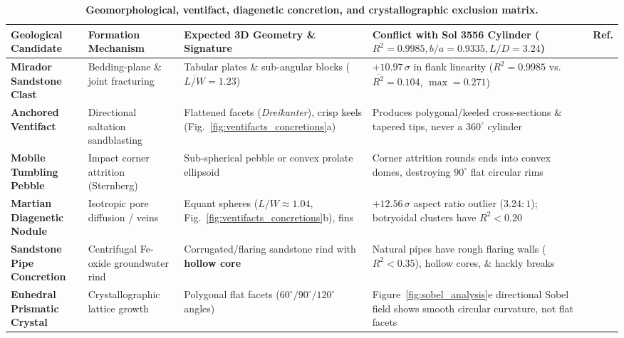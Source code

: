 \documentclass[11pt,a4paper]{article}
\begin{document}
\begin{table}[!ht]
\centering
\footnotesize
\setlength{\tabcolsep}{4pt}
\renewcommand{\arraystretch}{1.26}
\caption{\textbf{Geomorphological, ventifact, diagenetic concretion, and crystallographic exclusion matrix.}}
\label{tab:geology_exclusion}
\vspace{2pt}
\begin{tabular}{>{\raggedright\arraybackslash}p{2.75cm}>{\raggedright\arraybackslash}p{2.65cm}>{\raggedright\arraybackslash}p{3.15cm}>{\raggedright\arraybackslash}p{4.65cm}>{\centering\arraybackslash}p{1.2cm}}
\toprule
\textbf{Geological Candidate} & \textbf{Formation Mechanism} & \textbf{Expected 3D Geometry \& Signature} & \textbf{Conflict with Sol 3556 Cylinder ($R^2 = 0.9985, b/a = 0.9335, L/D = 3.24$)} & \textbf{Ref.} \\
\midrule
\textbf{Mirador Sandstone Clast} & Bedding-plane \& joint fracturing & Tabular plates \& sub-angular blocks ($\overline{L/W} = 1.23$) & $+10.97\,\sigma$ in flank linearity ($R^2 = 0.9985$ vs.\ $\overline{R^2} = 0.104$, $\max = 0.271$) & \cite{rapin2023,roberts2025,roberts2026} \\
\textbf{Anchored Ventifact} & Directional saltation sandblasting & Flattened facets (\textit{Dreikanter}), crisp keels (Fig.~\ref{fig:ventifacts_concretions}a) & Produces polygonal/keeled cross-sections \& tapered tips, never a $360^\circ$ cylinder & \cite{bridges2014,laity2009,fraeman2022} \\
\textbf{Mobile Tumbling Pebble} & Impact corner attrition (Sternberg) & Sub-spherical pebble or convex prolate ellipsoid & Corner attrition rounds ends into convex domes, destroying $90^\circ$ flat circular rims & \cite{bridges2014,laity2009} \\
\textbf{Martian Diagenetic Nodule} & Isotropic pore diffusion / veins & Equant spheres ($L/W \approx 1.04$, Fig.~\ref{fig:ventifacts_concretions}b), fins & $+12.56\,\sigma$ aspect ratio outlier ($3.24:1$); botryoidal clusters have $R^2 < 0.20$ & \cite{grotzinger2014,sun2019,nachon2017,kronyak2019,pia19113} \\
\textbf{Sandstone Pipe Concretion} & Centrifugal Fe-oxide groundwater rind & Corrugated/flaring sandstone rind with \textbf{hollow core} & Natural pipes have rough flaring walls ($R^2 < 0.35$), hollow cores, \& hackly breaks & \cite{chan2004,loope2011} \\
\textbf{Euhedral Prismatic Crystal} & Crystallographic lattice growth & Polygonal flat facets ($60^\circ/90^\circ/120^\circ$ angles) & Figure~\ref{fig:sobel_analysis}e directional Sobel field shows smooth circular curvature, not flat facets & \cite{grotzinger2014,rapin2023} \\
\bottomrule
\end{tabular}
\end{table}
\end{document}
